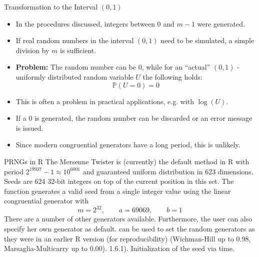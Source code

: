 \begin{vbframe}{Transformation to the Interval $(0, 1)$}

\vspace*{-0.4cm}

\begin{itemize}
\item In the procedures discussed, integers between $0$ and $m - 1$ were generated.
\item If real random numbers in the interval $(0, 1)$ need to be simulated, a simple division by $m$ is sufficient.
\item \textbf{Problem:} The random number can be $0$, while for an \enquote{actual} $(0, 1)$ - uniformly distributed random variable $U$ the following holds:
$$
\mathbb{P}(U = 0) = 0
$$
\item This is often a problem in practical applications, e.g. with $\log(U)$.
\item If a $0$ is generated, the random number can be discarded or an error message is issued.
\item Since modern congruential generators have a long period, this is unlikely.
\end{itemize}
%

\end{vbframe}

\begin{vbframe}{PRNGs in R}
The Mersenne Twister is (currently) the default method in R with period
$2^{19937} - 1 \approx 10^{6001}$ and guaranteed uniform distribution in
623 dimensions.
Seeds are 624 32-bit integers on top of the current position in this set. The  function generates a valid seed from a
single integer value using the linear congruential generator with
$$
  m=2^{32}, \qquad a=69069, \qquad b=1
$$
There are a number of other generators available. Furthermore, the
user can also specify her own generator as default.
 can be used to set the random generators as they were in an earlier R version (for reproducibility) (Wichman-Hill up to 0.98, Marsaglia-Multicarry up to 0.00).
1.6.1). Initialization of the seed via time.
\end{vbframe}


